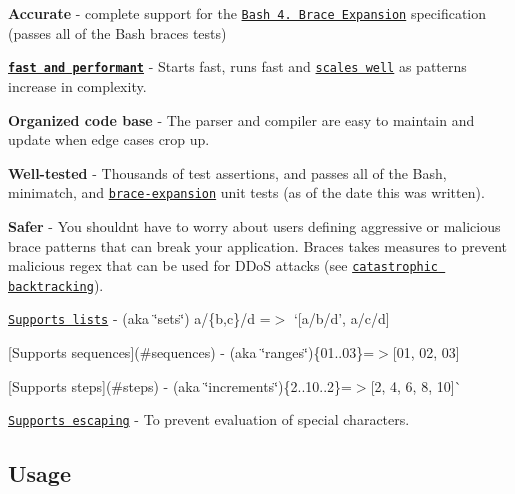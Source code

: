 \begin{DoxyItemize}
\item {\bfseries Accurate} -\/ complete support for the \href{www.gnu.org/software/bash/}{\tt Bash 4. Brace Expansion} specification (passes all of the Bash braces tests)
\item {\bfseries \href{#benchmarks}{\tt fast and performant}} -\/ Starts fast, runs fast and \href{#performance}{\tt scales well} as patterns increase in complexity.
\item {\bfseries Organized code base} -\/ The parser and compiler are easy to maintain and update when edge cases crop up.
\item {\bfseries Well-\/tested} -\/ Thousands of test assertions, and passes all of the Bash, minimatch, and \href{https://github.com/juliangruber/brace-expansion}{\tt brace-\/expansion} unit tests (as of the date this was written).
\item {\bfseries Safer} -\/ You shouldn\textquotesingle{}t have to worry about users defining aggressive or malicious brace patterns that can break your application. Braces takes measures to prevent malicious regex that can be used for D\+DoS attacks (see \href{https://www.regular-expressions.info/catastrophic.html}{\tt catastrophic backtracking}).
\item \href{#lists}{\tt Supports lists} -\/ (aka \char`\"{}sets\char`\"{}) {\ttfamily a/\{b,c\}/d} =$>$ `\mbox{[}\textquotesingle{}a/b/d', \textquotesingle{}a/c/d\textquotesingle{}\mbox{]}{\ttfamily }
\item {\ttfamily \mbox{[}Supports sequences\mbox{]}(\#sequences) -\/ (aka \char`\"{}ranges\char`\"{})}\{01..03\}{\ttfamily =$>$}\mbox{[}\textquotesingle{}01\textquotesingle{}, \textquotesingle{}02\textquotesingle{}, \textquotesingle{}03\textquotesingle{}\mbox{]}{\ttfamily }
\item {\ttfamily \mbox{[}Supports steps\mbox{]}(\#steps) -\/ (aka \char`\"{}increments\char`\"{})}\{2..10..2\}{\ttfamily =$>$}\mbox{[}\textquotesingle{}2\textquotesingle{}, \textquotesingle{}4\textquotesingle{}, \textquotesingle{}6\textquotesingle{}, \textquotesingle{}8\textquotesingle{}, \textquotesingle{}10\textquotesingle{}\mbox{]}\`{}
\item \href{#escaping}{\tt Supports escaping} -\/ To prevent evaluation of special characters.
\end{DoxyItemize}

\subsection*{Usage}

